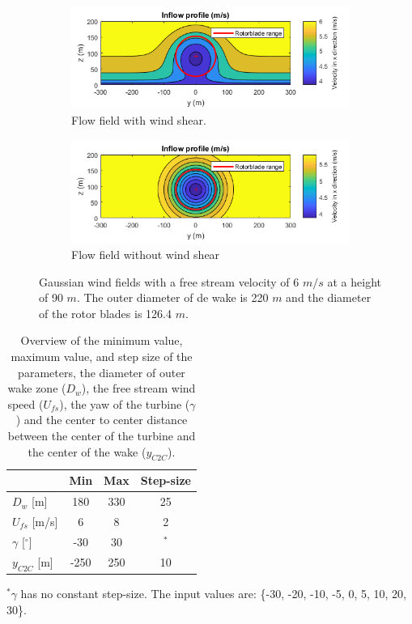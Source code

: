 \begin{figure}
	\centering
	\begin{subfigure}[b]{0.50\textwidth}
		\includegraphics[width=\linewidth]{./Figures/PlotwithshearU6D220.png} %
		\caption{Flow field with wind shear.}
		\label{fig:windsh}
	\end{subfigure}
	
	\begin{subfigure}[b]{0.50\textwidth}
		\includegraphics[width=\linewidth]{./Figures/PlotwithoutshearU6D220.png} %
		\caption{Flow field without wind shear}
		\label{fig:nowindsh}
	\end{subfigure}
	
	\caption[Two Gaussian flow fields]{Gaussian wind fields with a free stream velocity of 6 $m/s$ at a height of 90 $m$. The outer diameter of de wake is 220 $m$ and the diameter of the rotor blades is 126.4 $m$.}
	\label{fig:windshear}
\end{figure}




\begin{table}[h]
	\caption{Overview of the minimum value, maximum value, and step size of the parameters, the diameter of outer wake zone ($D_w$), the free stream wind speed ($U_{fs}$), the yaw of the turbine ($\gamma$) and the center to center distance between the center of the turbine and the center of the wake ($y_{C2C}$).}
	\centering
	\label{tab:pars}
	\begin{tabular}{lccc}
		\hline
	 	& Min & Max & Step-size \\ 
		\hline
		$D_w$ [m] & 180 & 330 & 25 \\
		$U_{fs}$ [m/s] & 6 & 8 & 2 \\
		$\gamma$ [$^\circ$] & -30 & 30 & $^*$ \\
		$y_{C2C}$ [m] & -250 & 250 & 10 \\
		\hline
	\end{tabular}

$^* \gamma$ has no constant step-size. The input values are: \{-30, -20, -10, -5, 0, 5, 10, 20, 30\}.
\end{table}

